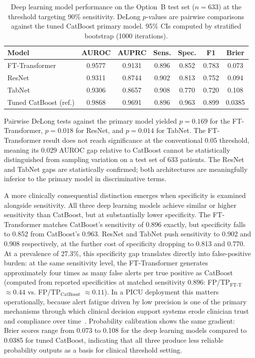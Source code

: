 \documentclass[final,3p,times]{elsarticle}
\begin{document}
\begin{table}[H]
\centering
\caption{Deep learning model performance on the Option~B test set
($n = 633$) at the threshold targeting 90\% sensitivity. DeLong
$p$-values are pairwise comparisons against the tuned CatBoost
primary model. 95\% CIs computed by stratified bootstrap
(1000 iterations).}
\label{tab:dl_results}
\small
\begin{tabular}{lcccccc}
\toprule
\textbf{Model} & \textbf{AUROC} & \textbf{AUPRC} & \textbf{Sens.} &
\textbf{Spec.} & \textbf{F1} & \textbf{Brier} \\
\midrule
FT-Transformer        & 0.9577 & 0.9131 & 0.896 & 0.852 & 0.783 & 0.073 \\
ResNet                & 0.9311 & 0.8744 & 0.902 & 0.813 & 0.752 & 0.094 \\
TabNet                & 0.9306 & 0.8657 & 0.908 & 0.770 & 0.720 & 0.108 \\
\midrule
Tuned CatBoost (ref.) & 0.9868 & 0.9691 & 0.896 & 0.963 & 0.899 & 0.0385 \\
\bottomrule
\end{tabular}
\end{table}

Pairwise DeLong tests against the primary model yielded
$p = 0.169$ for the FT-Transformer, $p = 0.018$ for ResNet, and
$p = 0.014$ for TabNet. The FT-Transformer result does not reach
significance at the conventional 0.05 threshold, meaning its
0.029 AUROC gap relative to CatBoost cannot be statistically
distinguished from sampling variation on a test set of 633
patients. The ResNet and TabNet gaps are statistically confirmed;
both architectures are meaningfully inferior to the primary model
in discriminative terms.

A more clinically consequential distinction emerges when
specificity is examined alongside sensitivity. All three deep
learning models achieve similar or higher sensitivity than
CatBoost, but at substantially lower specificity. The
FT-Transformer matches CatBoost's sensitivity of 0.896 exactly,
but specificity falls to 0.852 from CatBoost's 0.963. ResNet and
TabNet push sensitivity to 0.902 and 0.908 respectively, at the
further cost of specificity dropping to 0.813 and 0.770. At a
prevalence of 27.3\%, this specificity gap translates directly
into false-positive burden: at the same sensitivity level, the
FT-Transformer generates approximately four times as many false alerts
per true positive as CatBoost (computed from reported specificities at
matched sensitivity 0.896: FP/TP$_{\text{FT-T}}$ $\approx 0.44$ vs.
FP/TP$_{\text{CatBoost}}$ $\approx 0.11$). In a PICU deployment this matters
operationally, because alert fatigue driven by low precision is
one of the primary mechanisms through which clinical decision
support systems erode clinician trust and compliance over
time~\cite{athukorala2026}. Probability calibration shows the
same gradient: Brier scores range from 0.073 to 0.108 for the
deep learning models compared to 0.0385 for tuned CatBoost,
indicating that all three produce less reliable probability
outputs as a basis for clinical threshold setting.
\end{document}
